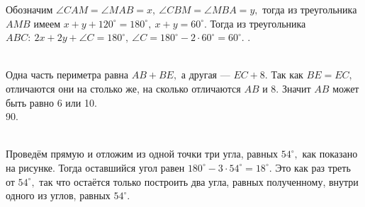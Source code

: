 \documentclass[12pt]{article}
\begin{document}
Обозначим $\angle CAM=\angle MAB=x,\ \angle CBM=\angle MBA=y,$ тогда из треугольника $AMB$ имеем $x+y+120^\circ=180^\circ,\ x+y=60^\circ.$ Тогда из треугольника $ABC:\ 2x+2y+\angle C=180^\circ,\ \angle C=180^\circ-2\cdot60^\circ=60^\circ.$\newpage
{}. \begin{figure}[ht!]
\end{figure}\\
Одна часть периметра равна $AB+BE,$ а другая --- $EC+8.$ Так как $BE=EC,$ отличаются они на столько же, на сколько отличаются $AB$ и 8. Значит $AB$ может быть равно 6 или 10.\\
90. \begin{figure}[ht!]
\end{figure}\\Проведём прямую и отложим из одной точки три угла, равных $54^\circ,$ как показано на рисунке. Тогда оставшийся угол равен $180^\circ-3\cdot54^\circ=18^\circ.$ Это как раз треть от $54^\circ,$ так что остаётся только построить два угла, равных полученному, внутри одного из углов, равных $54^\circ.$\\
\end{document}
